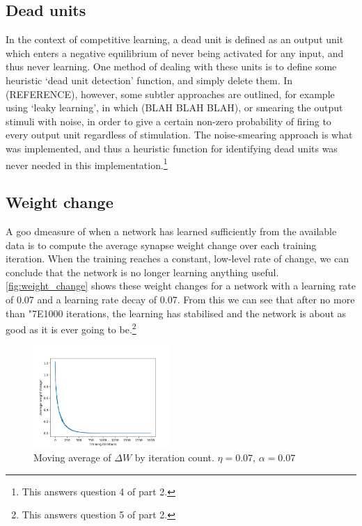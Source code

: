 \documentclass[a4paper, 11pt, twocolumn, draft]{article} %
\begin{document}
\subsection{Dead units} \label{sec:deadunits} In the context of competitive
learning, a dead unit is defined as an output unit which enters a negative
equilibrium of never being activated for any input, and thus never learning. One
method of dealing with these units is to define some heuristic `dead unit
detection' function, and simply delete them.  In (REFERENCE), however, some
subtler approaches are outlined, for example using `leaky learning', in which
(BLAH BLAH BLAH), or smearing the output stimuli with noise, in order to give a
certain non-zero probability of firing to every output unit regardless of
stimulation.  The noise-smearing approach is what was implemented, and thus a
heuristic function for identifying dead units was never needed in this
implementation.\footnote{This answers question 4 of part 2.}

\subsection{Weight change} A goo dmeasure of when a network has learned
sufficiently from the available data is to compute the average synapse weight
change over each training iteration.  When the training reaches a constant,
low-level rate of change, we can conclude that the network is no longer learning
anything useful.  \autoref{fig:weight_change} shows these weight changes for a
network with a learning rate of 0.07 and a learning rate decay of 0.07.  From
this we can see that after no more than \char"7E{}1000 iterations, the learning
has stabilised and the network is about as good as it is ever going to
be.\footnote{This answers question 5 of part 2.}

\begin{figure}
  \includegraphics[width=0.46\textwidth]{dw_average.png}
  \caption{Moving average of $\Delta{}W$ by iteration count.
           $\eta = 0.07$, $\alpha = 0.07$}
  \label{fig:weight_change}
\end{figure}
\end{document}
